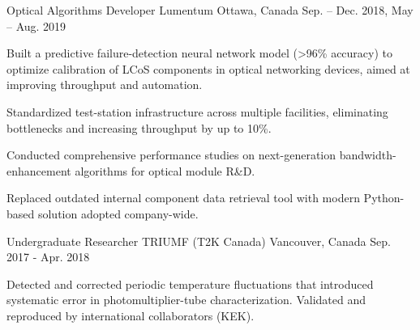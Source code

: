 \begin{cventries}

  \cventry
    {Optical Algorithms Developer} %
    {Lumentum} %
    {Ottawa, Canada} %
    {Sep. -- Dec. 2018, May -- Aug. 2019} %
    {
      \begin{cvitems} %
        \item{Built a predictive failure-detection neural network model (>96\% accuracy) to optimize calibration of LCoS components in optical networking devices, aimed at improving throughput and automation.}
        \item{Standardized test-station infrastructure across multiple facilities, eliminating bottlenecks and increasing throughput by up to 10\%.}
        \item{Conducted comprehensive performance studies on next-generation bandwidth-enhancement algorithms for optical module R\&D.}
        \item{Replaced outdated internal component data retrieval tool with modern Python-based solution adopted company-wide.}
      \end{cvitems}
    }


  \cventry
    {Undergraduate Researcher} %
    {TRIUMF (T2K Canada)} %
    {Vancouver, Canada} %
    {Sep. 2017 - Apr. 2018} %
    {
      \begin{cvitems} %
        \item {Detected and corrected periodic temperature fluctuations that introduced systematic error in photomultiplier-tube characterization. Validated and reproduced by international collaborators (KEK).}
      \end{cvitems}
    }


\end{cventries}
